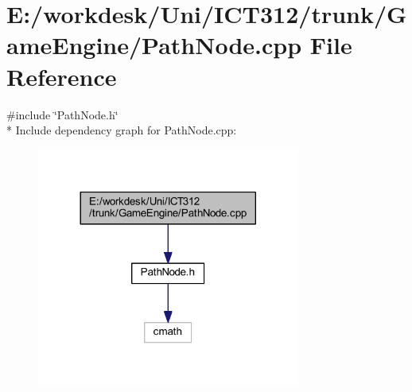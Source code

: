\section{E\+:/workdesk/\+Uni/\+I\+C\+T312/trunk/\+Game\+Engine/\+Path\+Node.cpp File Reference}
\label{_path_node_8cpp}
{\ttfamily \#include \char`\"{}Path\+Node.\+h\char`\"{}}\\*
Include dependency graph for Path\+Node.\+cpp\+:\nopagebreak
\begin{figure}[H]
\begin{center}
\leavevmode
\includegraphics[width=245pt]{dd/d92/_path_node_8cpp__incl}
\end{center}
\end{figure}
